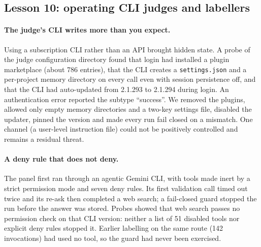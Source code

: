 \documentclass[10pt,a4paper]{article}
\begin{document}
\subsection{Lesson 10: operating CLI judges and labellers}\label{sec:l8}

\paragraph{The judge's CLI writes more than you expect.}
Using a subscription CLI rather than an API brought hidden state. A probe of the judge configuration directory
found that login had installed a plugin marketplace (about 786 entries), that the CLI creates a
\texttt{settings.json} and a per-project memory directory on every call even with session persistence off, and
that the CLI had auto-updated from 2.1.293 to 2.1.294 during login. An authentication error reported the subtype
``success''.
We removed the plugins, allowed only empty memory directories and a two-key settings file, disabled the updater,
pinned the version and made every run fail closed on a mismatch. One channel (a user-level instruction file) could
not be positively controlled and remains a residual threat.

\paragraph{A deny rule that does not deny.}
The panel first ran through an agentic Gemini CLI, with tools made inert by a strict permission mode and seven deny
rules. Its first validation call timed out twice and its re-ask then completed a web search; a fail-closed guard
stopped the run before the answer was stored. Probes showed that web search passes no permission check on that CLI
version: neither a list of 51 disabled tools nor explicit deny rules stopped it.
Earlier labelling on the same route (142 invocations) had used no tool, so the guard had never been exercised.
\end{document}
